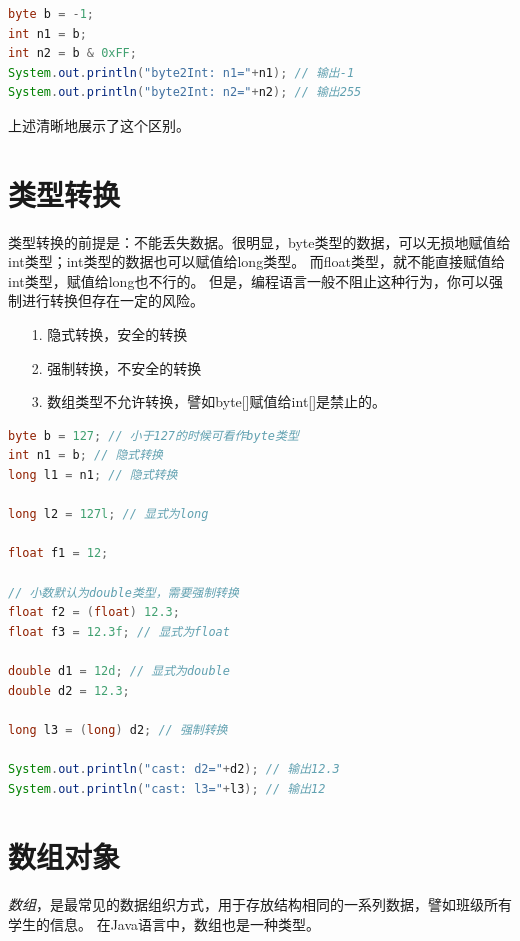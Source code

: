 \begin{lstlisting}[language=Java, caption={byte->int},label=code:part1_byte_to_int]
byte b = -1;
int n1 = b;
int n2 = b & 0xFF;
System.out.println("byte2Int: n1="+n1); // 输出-1
System.out.println("byte2Int: n2="+n2); // 输出255
\end{lstlisting}

\noindent
上述清晰地展示了这个区别。

\section{类型转换}
类型转换的前提是：不能丢失数据。很明显，byte类型的数据，可以无损地赋值给int类型；int类型的数据也可以赋值给long类型。
而float类型，就不能直接赋值给int类型，赋值给long也不行的。
但是，编程语言一般不阻止这种行为，你可以强制进行转换但存在一定的风险。

\begin{itemize}
\item [1.] 隐式转换，安全的转换
\item [2.] 强制转换，不安全的转换
\item [3.] 数组类型不允许转换，譬如byte[]赋值给int[]是禁止的。
\end{itemize}

\begin{lstlisting}[language=Java]
byte b = 127; // 小于127的时候可看作byte类型
int n1 = b; // 隐式转换
long l1 = n1; // 隐式转换

long l2 = 127l; // 显式为long

float f1 = 12;

// 小数默认为double类型，需要强制转换
float f2 = (float) 12.3;
float f3 = 12.3f; // 显式为float

double d1 = 12d; // 显式为double
double d2 = 12.3;

long l3 = (long) d2; // 强制转换

System.out.println("cast: d2="+d2); // 输出12.3
System.out.println("cast: l3="+l3); // 输出12
\end{lstlisting}


\section{数组对象}

\emph{数组}，是最常见的数据组织方式，用于存放结构相同的一系列数据，譬如班级所有学生的信息。
在Java语言中，数组也是一种类型。

